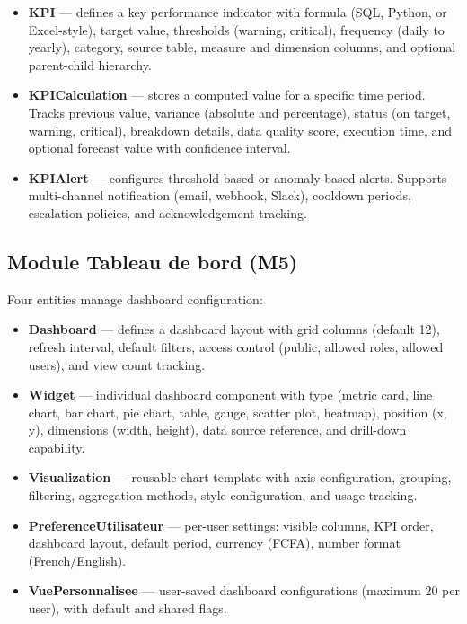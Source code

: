 \begin{itemize}
  \item \textbf{KPI} — defines a key performance indicator
        with formula (SQL, Python, or Excel-style),
        target value, thresholds (warning, critical),
        frequency (daily to yearly), category,
        source table, measure and dimension columns,
        and optional parent-child hierarchy.
  \item \textbf{KPICalculation} — stores a computed value
        for a specific time period.
        Tracks previous value, variance (absolute
        and percentage), status (on target, warning,
        critical), breakdown details, data quality score,
        execution time, and optional forecast value
        with confidence interval.
  \item \textbf{KPIAlert} — configures threshold-based
        or anomaly-based alerts.
        Supports multi-channel notification
        (email, webhook, Slack), cooldown periods,
        escalation policies, and acknowledgement tracking.
\end{itemize}

\subsection{Module Tableau de bord (M5)}

\noindent
Four entities manage dashboard configuration:

\begin{itemize}
  \item \textbf{Dashboard} — defines a dashboard layout
        with grid columns (default 12),
        refresh interval, default filters,
        access control (public, allowed roles, allowed users),
        and view count tracking.
  \item \textbf{Widget} — individual dashboard component
        with type (metric card, line chart, bar chart,
        pie chart, table, gauge, scatter plot, heatmap),
        position (x, y), dimensions (width, height),
        data source reference, and drill-down capability.
  \item \textbf{Visualization} — reusable chart template
        with axis configuration, grouping, filtering,
        aggregation methods, style configuration,
        and usage tracking.
  \item \textbf{PreferenceUtilisateur} — per-user settings:
        visible columns, KPI order, dashboard layout,
        default period, currency (FCFA), number format
        (French/English).
  \item \textbf{VuePersonnalisee} — user-saved dashboard
        configurations (maximum 20 per user),
        with default and shared flags.
\end{itemize}

